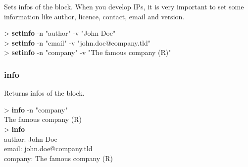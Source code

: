 \documentclass[10pt,a4paper]{article}
\begin{document}
Sets infos of the block. When you develop IPs, it is very important to set some information like author, licence, contact, email and version. \\


\begin{sampletitle}
> \textbf{\tool{} setinfo} -n "author"  -v "John Doe"\\
> \textbf{\tool{} setinfo} -n "email"  -v "john.doe@company.tld"\\
> \textbf{\tool{} setinfo} -n "company"  -v "The famous company (R)"
\end{sampletitle}

\subsubsection{info}

Returns infos of the block. \\


\begin{sampletitle}
> \textbf{\tool{} info} -n "company"\\The famous company (R)\\
> \textbf{\tool{} info}\\
author: John Doe\\
email: john.doe@company.tld\\
company: The famous company (R)
\end{sampletitle}
\end{document}
